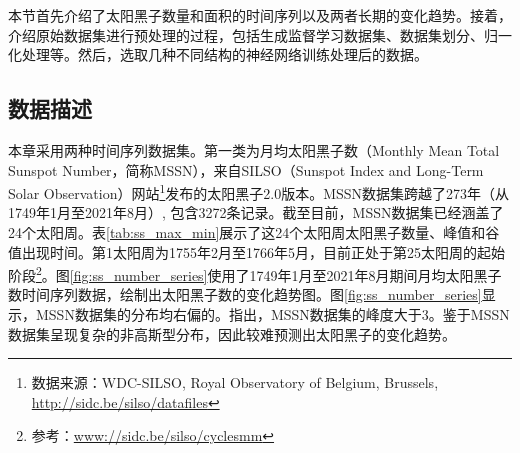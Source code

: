 本节首先介绍了太阳黑子数量和面积的时间序列以及两者长期的变化趋势。接着，介绍原始数据集进行预处理的过程，包括生成监督学习数据集、数据集划分、归一化处理等。然后，选取几种不同结构的神经网络训练处理后的数据。

\subsection{数据描述}\label{sec:ss_dataset}

本章采用两种时间序列数据集。第一类为月均太阳黑子数（Monthly Mean Total Sunspot Number，简称MSSN），来自SILSO（Sunspot Index and Long-Term Solar Observation）网站\footnote{数据来源：WDC-SILSO, Royal Observatory of Belgium, Brussels, \href{http://sidc.be/silso/datafiles}{http://sidc.be/silso/datafiles}}发布的太阳黑子2.0版本。MSSN数据集跨越了273年（从1749年1月至2021年8月）, 包含3272条记录。截至目前，MSSN数据集已经涵盖了24个太阳周。表\ref{tab:ss_max_min}展示了这24个太阳周太阳黑子数量、峰值和谷值出现时间。第1太阳周为1755年2月至1766年5月，目前正处于第25太阳周的起始阶段\footnote{参考：\href{www://sidc.be/silso/cyclesmm}{www://sidc.be/silso/cyclesmm}}。图\ref{fig:ss_number_series}使用了1749年1月至2021年8月期间月均太阳黑子数时间序列数据，绘制出太阳黑子数的变化趋势图。图\ref{fig:ss_number_series}显示，MSSN数据集的分布均右偏的。\citet{panigrahi2021forecasting}指出，MSSN数据集的峰度大于3。鉴于MSSN数据集呈现复杂的非高斯型分布，因此较难预测出太阳黑子的变化趋势。

